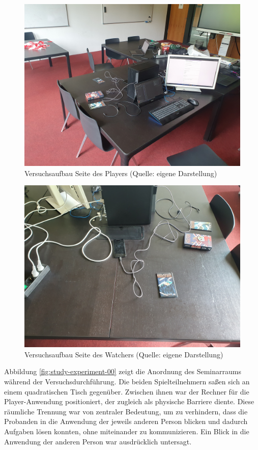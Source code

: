 \begin{figure}[ht]
\centering
\includegraphics[width=0.8\linewidth]{content/pictures/Aufbau_01.jpg}
\caption{Versuchsaufbau Seite des Players (Quelle: eigene Darstellung)}
\label{fig:study-experiment-01}
\end{figure}

\begin{figure}[ht]
\centering
\includegraphics[width=0.8\linewidth]{content/pictures/Aufbau_02.jpg}
\caption{Versuchsaufbau Seite des Watchers (Quelle: eigene Darstellung)}
\label{fig:study-experiment-02}
\end{figure}

Abbildung \ref{fig:study-experiment-00} zeigt die Anordnung des Seminarraums während der Versuchsdurchführung. Die beiden Spielteilnehmern saßen sich an einem quadratischen Tisch gegenüber. Zwischen ihnen war der Rechner für die Player-Anwendung positioniert, der zugleich als  physische Barriere diente. Diese räumliche Trennung war von zentraler Bedeutung, um zu verhindern, dass die Probanden in die Anwendung der jeweils anderen Person blicken und dadurch Aufgaben lösen konnten, ohne miteinander zu kommunizieren. Ein Blick in die Anwendung der anderen Person war ausdrücklich untersagt. 

